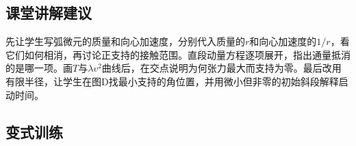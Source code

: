 \documentclass[UTF8,fontset=fandol,a4paper,11pt]{ctexart}
\begin{document}

\subsection*{课堂讲解建议}

先让学生写弧微元的质量和向心加速度，分别代入质量的$r$和向心加速度的$1/r$，看它们如何相消，再讨论正支持的接触范围。直段动量方程逐项展开，指出通量抵消的是哪一项。画$T$与$\lambda v^2$曲线后，在交点说明为何张力最大而支持为零。最后改用有限半径，让学生在图D找最小支持的角位置，并用微小但非零的初始斜段解释启动时间。



\subsection*{变式训练}
\end{document}
